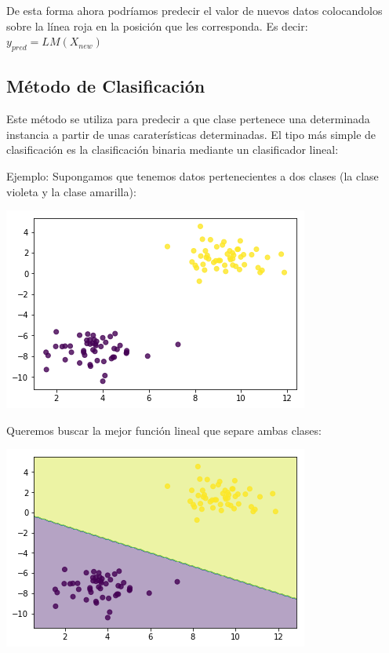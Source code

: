 De esta forma ahora podríamos predecir el valor de nuevos datos colocandolos sobre la línea roja en la posición que les corresponda.  
Es decir: $y_{pred} = LM(X_{new})$

\subsection{Método de Clasificación}

Este método se utiliza para predecir a que clase pertenece una determinada instancia a partir de unas caraterísticas determinadas.  
El tipo más simple de clasificación es la clasificación binaria mediante un clasificador lineal:

Ejemplo: 
Supongamos que tenemos datos pertenecientes a dos clases (la clase violeta y la clase amarilla):
\begin{center}
\includegraphics[scale=0.7]{./img/class_lin_data.png}
\end{center}
Queremos buscar la mejor función lineal que separe ambas clases:
\begin{center}
\includegraphics[scale=0.7]{./img/class_lin_fit.png}
\end{center}

\pagebreak

